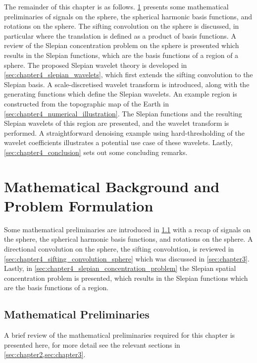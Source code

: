 The remainder of this chapter is as follows.
\cref{sec:chapter4_mathematical_background_problem_formulation} presents some mathematical preliminaries of signals on the sphere, the spherical harmonic basis functions, and rotations on the sphere.
The sifting convolution on the sphere is discussed, in particular where the translation is defined as a product of basis functions.
A review of the Slepian concentration problem on the sphere is presented which results in the Slepian functions, which are the basis functions of a region of a sphere.
The proposed Slepian wavelet theory is developed in \cref{sec:chapter4_slepian_wavelets}, which first extends the sifting convolution to the Slepian basis.
A scale-discretised wavelet transform is introduced, along with the generating functions which define the Slepian wavelets.
An example region is constructed from the topographic map of the Earth in \cref{sec:chapter4_numerical_illustration}.
The Slepian functions and the resulting Slepian wavelets of this region are presented, and the wavelet transform is performed.
A straightforward denoising example using hard-thresholding of the wavelet coefficients illustrates a potential use case of these wavelets.
Lastly, \cref{sec:chapter4_conclusion} sets out some concluding remarks.

\section{Mathematical Background and Problem Formulation}\label{sec:chapter4_mathematical_background_problem_formulation}

Some mathematical preliminaries are introduced in \cref{sec:chapter4_mathematical_preliminaries} with a recap of signals on the sphere, the spherical harmonic basis functions, and rotations on the sphere.
A directional convolution on the sphere, the sifting convolution, is reviewed in \cref{sec:chapter4_sifting_convolution_sphere} which was discussed in \cref{sec:chapter3}.
Lastly, in \cref{sec:chapter4_slepian_concentration_problem} the Slepian spatial concentration problem is presented, which results in the Slepian functions which are the basis functions of a region.

\subsection{Mathematical Preliminaries}\label{sec:chapter4_mathematical_preliminaries}

A brief review of the mathematical preliminaries required for this chapter is presented here, for more detail see the relevant sections in \cref{sec:chapter2,sec:chapter3}.

